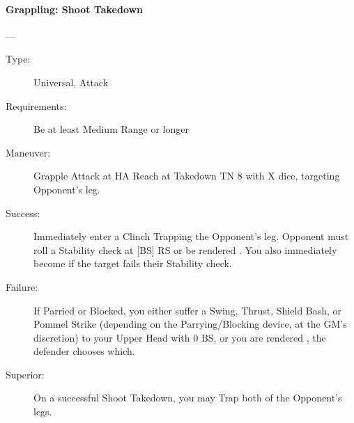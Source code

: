 \paragraph{Grappling: Shoot Takedown \large} \label{man:grappling-shoot-takedown}
---\quad {\large [X]}
\vspace{-10pt} \begin{description}
\item [Type:] Universal, Attack
\item [Requirements:] Be at least Medium Range or longer
\item [Maneuver:] Grapple Attack at HA Reach at Takedown TN 8 with X dice,
  targeting Opponent’s leg.

\item [Success:] Immediately enter a Clinch Trapping the Opponent’s leg.
  Opponent must roll a Stability check at [BS] RS or be rendered . You also
  immediately become  if the target fails their Stability check.

\item [Failure:] If Parried or Blocked, you either suffer a Swing, Thrust,
  Shield Bash, or Pommel Strike (depending on the Parrying/Blocking device, at
  the GM's discretion) to your Upper Head with 0 BS, or you are rendered ,
  the defender chooses which.

\item [Superior:] On a successful Shoot Takedown, you may Trap both of the
  Opponent’s legs. 
\end{description}

